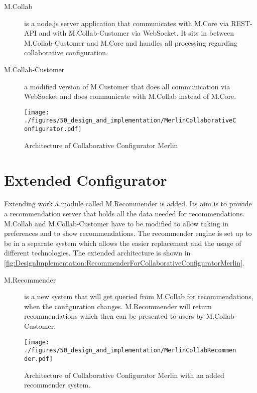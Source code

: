 \begin{description}
    \item[M.Collab] is a node.js server application that communicates with M.Core via REST-API and with M.Collab-Customer via WebSocket. It sits in between M.Collab-Customer and M.Core and handles all processing regarding collaborative configuration.
    \item[M.Collab-Customer] a modified version of M.Customer that does all communication via WebSocket and does communicate with M.Collab instead of M.Core.
\end{description}

\begin{figure}
    \centering
    \texttt{[image: ./figures/50\_design\_and\_implementation/MerlinCollaborativeConfigurator.pdf]}
    \caption{Architecture of Collaborative Configurator Merlin \cite[Fig. 4.3]{raabKollaborativeProduktkonfigurationEchtzeit2019}}
    \label{fig:DesignImplementation:CollaborativeConfiguratorMerlin}
\end{figure}


\section{Extended Configurator}
\label{sec:DesignImplementation:ExtendedConfigurator}

Extending \citeauthor{raabKollaborativeProduktkonfigurationEchtzeit2019} \cite{raabKollaborativeProduktkonfigurationEchtzeit2019} work a module called M.Recommender is added. Its aim is to provide a recommendation server that holds all the data needed for recommendations. M.Collab and M.Collab-Customer have to be modified to allow taking in preferences and to show  recommendations. The recommender engine is set up to be in a separate system which allows the easier replacement and the usage of different technologies. The extended architecture is shown in \autoref{fig:DesignImplementation:RecommenderForCollaborativeConfiguratorMerlin}.

\begin{description}
    \item[M.Recommender] is a new system that will get queried from M.Collab for recommendations, when the configuration changes. M.Recommender will return recommendations which then can be presented to users by M.Collab-Customer.
\end{description}

\begin{figure}
    \centering
    \texttt{[image: ./figures/50\_design\_and\_implementation/MerlinCollabRecommender.pdf]}
    \caption{Architecture of Collaborative Configurator Merlin with an added recommender system.}
    \label{fig:DesignImplementation:RecommenderForCollaborativeConfiguratorMerlin}
\end{figure}